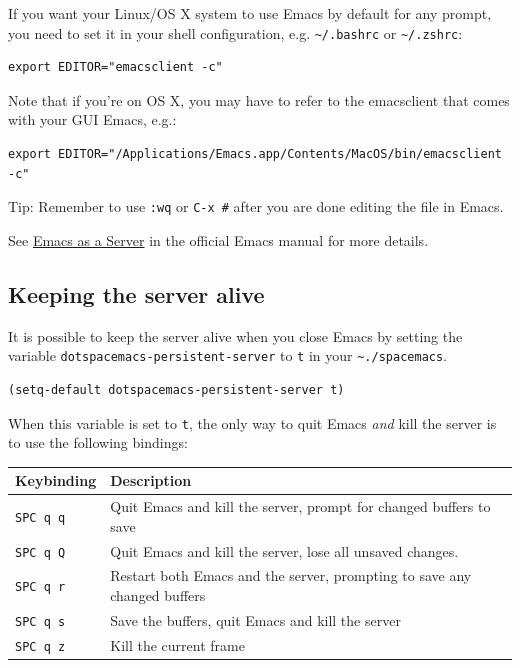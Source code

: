\documentclass[11pt]{article}
\begin{document}
If you want your Linux/OS X system to use Emacs by default for any prompt, you
need to set it in your shell configuration, e.g. \texttt{\textasciitilde{}/.bashrc} or \texttt{\textasciitilde{}/.zshrc}:

\begin{verbatim}
export EDITOR="emacsclient -c"
\end{verbatim}

Note that if you're on OS X, you may have to refer to the emacsclient that comes
with your GUI Emacs, e.g.:

\begin{verbatim}
export EDITOR="/Applications/Emacs.app/Contents/MacOS/bin/emacsclient -c"
\end{verbatim}

Tip: Remember to use \texttt{:wq} or \texttt{C-x \#} after you are done editing the file in
Emacs.

See \href{https://www.gnu.org/software/emacs/manual/html\_node/emacs/Emacs-Server.html}{Emacs as a Server} in the official Emacs manual for more details.

\subsection{Keeping the server alive}
\label{sec:org7504305}
It is possible to keep the server alive when you close Emacs by setting the
variable \texttt{dotspacemacs-persistent-server} to \texttt{t} in your \texttt{\textasciitilde{}./spacemacs}.

\begin{verbatim}
(setq-default dotspacemacs-persistent-server t)
\end{verbatim}

When this variable is set to \texttt{t}, the only way to quit Emacs \emph{and} kill the
server is to use the following bindings:

\begin{center}
\begin{tabular}{ll}
Keybinding & Description\\
\hline
\texttt{SPC q q} & Quit Emacs and kill the server, prompt for changed buffers to save\\
\texttt{SPC q Q} & Quit Emacs and kill the server, lose all unsaved changes.\\
\texttt{SPC q r} & Restart both Emacs and the server, prompting to save any changed buffers\\
\texttt{SPC q s} & Save the buffers, quit Emacs and kill the server\\
\texttt{SPC q z} & Kill the current frame\\
\end{tabular}
\end{center}
\end{document}
